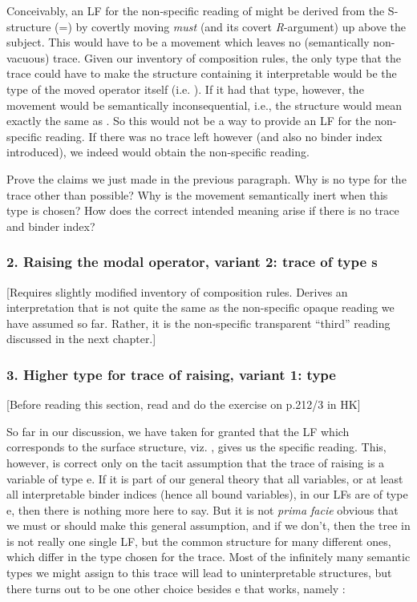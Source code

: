 Conceivably, an LF for the non-specific reading of  might be derived
from the S-structure (=) by covertly moving \emph{must} (and its
covert \emph{R}-argument) up above the subject. This would have to be a movement
which leaves no (semantically non-vacuous) trace. Given our inventory of
composition rules, the only type that the trace could have to make the structure
containing it interpretable would be the type of the moved operator itself (i.e.
). If it had that type, however, the movement would be semantically
inconsequential, i.e., the structure would mean exactly the same as .
So this would not be a way to provide an LF for the non-specific reading. If
there was no trace left however (and also no binder index introduced), we indeed
would obtain the non-specific reading.
\begin{exercise}
	Prove the claims we just made in the previous paragraph. Why is no type for
  the trace other than  possible? Why is the movement semantically
  inert when this type is chosen? How does the correct intended meaning arise if
  there is no trace and binder index? \eex
\end{exercise}

\subsubsection{2. Raising the modal operator, variant 2: trace of type s}

[Requires slightly modified inventory of composition rules. Derives an
interpretation that is not quite the same as the non-specific opaque reading we
have assumed so far. Rather, it is the non-specific transparent ``third''
reading discussed in the next chapter.]

\subsubsection{3. Higher type for trace of raising, variant 1: type  }

[Before reading this section, read and do the exercise on p.212/3 in H\amp K]

\absatz So far in our discussion, we have taken for granted that the LF which
corresponds to the surface structure, viz. , gives us the specific
reading. This, however, is correct only on the tacit assumption that the trace
of raising is a variable of type e. If it is part of our general theory that all
variables, or at least all interpretable binder indices (hence all bound
variables), in our LFs are of type e, then there is nothing more here to say.
But it is not \emph{prima facie} obvious that we must or should make this
general assumption, and if we don't, then the tree in  is not really
one single LF, but the common structure for many different ones, which differ in
the type chosen for the trace. Most of the infinitely many semantic types we
might assign to this trace will lead to uninterpretable structures, but there
turns out to be one other choice besides e that works, namely :

